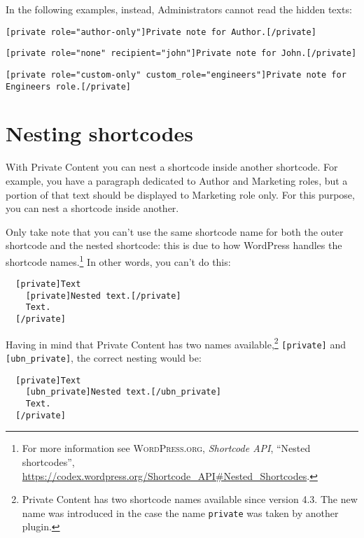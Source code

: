 In the following examples, instead, Administrators cannot read the hidden texts:

\begin{lstlisting}
[private role="author-only"]Private note for Author.[/private]
\end{lstlisting}

\begin{lstlisting}
[private role="none" recipient="john"]Private note for John.[/private]
\end{lstlisting}

\begin{lstlisting}
[private role="custom-only" custom_role="engineers"]Private note for Engineers role.[/private]
\end{lstlisting}

\chapter{Nesting shortcodes}

With Private Content you can nest a shortcode inside another shortcode. For
example, you have a paragraph dedicated to Author and Marketing roles, but a
portion of that text should be displayed to Marketing role only. For this
purpose, you can nest a shortcode inside another.

Only take note that you can't use the same shortcode name for both the outer
shortcode and the nested shortcode: this is due to how WordPress handles the
shortcode names.\footnote{For more information see \textsc{WordPress.org},
\textit{Shortcode API}, ``Nested shortcodes'',
\url{https://codex.wordpress.org/Shortcode_API\#Nested_Shortcodes}.}
In other words, you can't do this:

\begin{lstlisting}
  [private]Text
    [private]Nested text.[/private]
    Text.
  [/private]
\end{lstlisting}

Having in mind that Private Content has two names available,\footnote{Private
Content has two shortcode names available since version 4.3. The new name was
introduced in the case the name \texttt{private} was taken by another plugin.}
\texttt{[private]} and \texttt{[ubn\_private]}, the correct nesting would be:

\begin{lstlisting}
  [private]Text
    [ubn_private]Nested text.[/ubn_private]
    Text.
  [/private]
\end{lstlisting}

